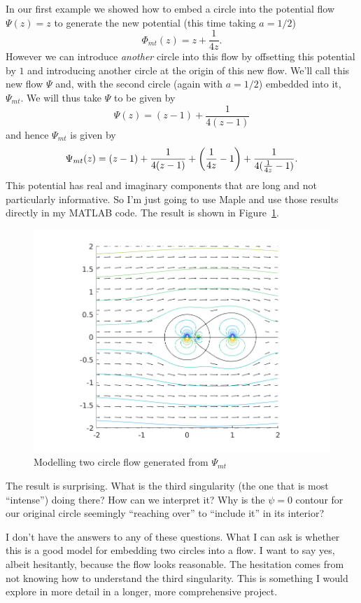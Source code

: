 \documentclass{article}
\begin{document}
In our first example we showed how to embed a circle into the potential
flow $\Psi(z) = z$ to generate the new potential (this time taking $a = 1/2$)
%
\begin{equation*}
    \Phi_{mt}(z) = z + \frac{1}{4 z}
    .
\end{equation*}
%
However we can introduce \textit{another} circle into this flow by
offsetting this potential by $1$ and introducing another circle at the
origin of this new flow. We'll call this new flow $\Psi$ and, with the
second circle (again with $a = 1/2$) embedded into it, $\Psi_{mt}$. We
will thus take $\Psi$ to be given by
%
\begin{equation*}
    \Psi(z) = (z - 1) + \frac{1}{4 (z - 1)}
\end{equation*}
%
and hence $\Psi_{mt}$ is given by
%
\begin{equation*}
    \Psi_{mt}(z)
        = (z - 1) + \frac{1}{4 (z - 1)}
        + \del{\frac{1}{4z} - 1} + \frac{1}{4 (\frac{1}{4z} - 1)}
        .
\end{equation*}
%
This potential has real and imaginary components that are long and not
particularly informative. So I'm just going to use Maple and use those
results directly in my MATLAB code. The result is shown in
Figure~\ref{fig:mt-6}.
%
\begin{figure}[ht]
    \includegraphics[width=35em]{mt_ex3_1}
    \centering
    \caption{Modelling two circle flow generated from $\Psi_{mt}$}
    \label{fig:mt-6}
\end{figure}
%
The result is surprising. What is the third singularity (the one that is
most ``intense'') doing there? How can we interpret it? Why is the $\psi
= 0$ contour for our original circle seemingly ``reaching over'' to
``include it'' in its interior?

I don't have the answers to any of these questions. What I can ask is
whether this is a good model for embedding two circles into a flow. I
want to say yes, albeit hesitantly, because the flow looks reasonable.
The hesitation comes from not knowing how to understand the third
singularity. This is something I would explore in more detail in a
longer, more comprehensive project.
\end{document}
